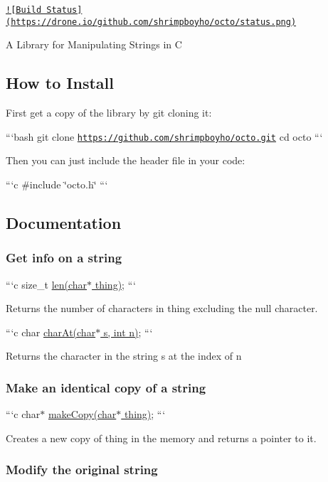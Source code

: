 \href{https://drone.io/github.com/shrimpboyho/octo/latest}{\tt !\mbox{[}Build Status\mbox{]}(https\-://drone.\-io/github.\-com/shrimpboyho/octo/status.\-png)}

A Library for Manipulating Strings in C

\subsection*{How to Install }

First get a copy of the library by git cloning it\-:

```bash git clone \href{https://github.com/shrimpboyho/octo.git}{\tt https\-://github.\-com/shrimpboyho/octo.\-git} cd octo ```

Then you can just include the header file in your code\-:

```c \#include \char`\"{}octo.\-h\char`\"{} ```

\subsection*{Documentation }

\subsubsection*{Get info on a string}

```c size\-\_\-t \hyperlink{octo_8h_a5220546523fb002b2b31820d8e5b7404}{len(char$\ast$ thing)}; ```

Returns the number of characters in {\ttfamily thing} excluding the null character.

```c char \hyperlink{octo_8h_a88a1198280f9085daf3f73f1609b5d97}{char\-At(char$\ast$ s, int n)}; ```

Returns the character in the string {\ttfamily s} at the index of {\ttfamily n}

\subsubsection*{Make an identical copy of a string}

```c char$\ast$ \hyperlink{octo_8h_a2390ef9a15b12afe4e8815bf93682c17}{make\-Copy(char$\ast$ thing)}; ```

Creates a new copy of {\ttfamily thing} in the memory and returns a pointer to it.

\subsubsection*{Modify the original string}

